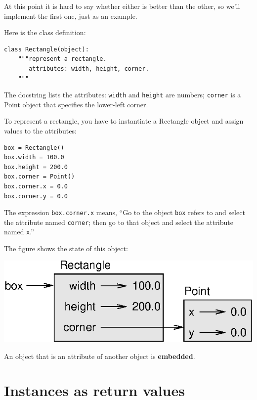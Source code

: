 \documentclass[10pt]{book}
\begin{document}
At this point it is hard to say whether either is better than
the other, so we'll implement the first one, just as an example.


Here is the class definition:

\beforeverb
\begin{verbatim}
class Rectangle(object):
    """represent a rectangle. 
       attributes: width, height, corner.
    """
\end{verbatim}
\afterverb
%
The docstring lists the attributes:  {\tt width} and
{\tt height} are numbers; {\tt corner} is a Point object that
specifies the lower-left corner.

To represent a rectangle, you have to instantiate a Rectangle
object and assign values to the attributes:

\beforeverb
\begin{verbatim}
box = Rectangle()
box.width = 100.0
box.height = 200.0
box.corner = Point()
box.corner.x = 0.0
box.corner.y = 0.0
\end{verbatim}
\afterverb
%
The expression {\tt box.corner.x} means,
``Go to the object {\tt box} refers to and select the attribute named
{\tt corner}; then go to that object and select the attribute named
{\tt x}.''

The figure shows the state of this object:


\beforefig
\centerline{\includegraphics{figs/rectangle.eps}}
\afterfig

An object that is an attribute of another object is {\bf embedded}.



\section{Instances as return values}
\end{document}

